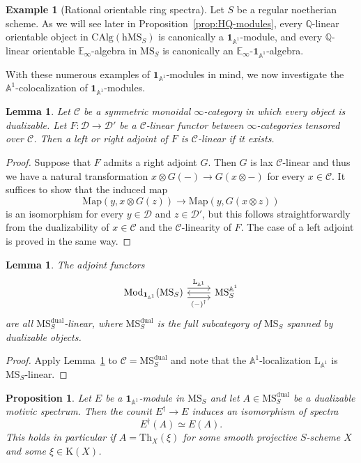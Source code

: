 \documentclass{amsart}
\numberwithin{equation}{section}
\theoremstyle{plain}
\newtheorem{proposition}[equation]{Proposition}
\newtheorem{lemma}[equation]{Lemma}
\theoremstyle{definition}
\newtheorem{example}[equation]{Example}
\let\bb=\mathbb
\def\Q{\bb Q}
\def\A{\bb A}
\def\1{\mathbf 1}
\def\h{\mathrm h}
\def\ph{\mathord-}
\def\L{\mathrm{L}{}}
\def\Map{\mathrm{Map}}
\def\Th{\mathrm{Th}}
\def\E{\mathbb{E}}
\let\cat=\mathrm
\def\K{\mathrm{K}{}}
\def\Mod{\cat{M}\mathrm{od}{}}
\def\MS{\mathrm{MS}}
\def\CAlg{\mathrm{CAlg}{}}
\newcommand{\CC}{\mathcal{C}}
\newcommand{\DD}{\mathcal{D}}
\def\dual{\mathrm{dual}}
\begin{document}
\begin{example}[Rational orientable ring spectra]
\label{ex:Q-orientable}
Let $S$ be a regular noetherian scheme. As we will see later in Proposition~\ref{prop:HQ-modules}, every $\Q$-linear orientable object in $\CAlg(\h\MS_S)$ is canonically a $\1_{\A^1}$-module, and every $\Q$-linear orientable $\E_\infty$-algebra in $\MS_S$ is canonically an $\E_\infty$-$\1_{\A^1}$-algebra.
\end{example}

With these numerous examples of $\1_{\A^1}$-modules in mind, we now investigate the $\A^1$-colocalization of $\1_{\A^1}$-modules.

\begin{lemma}\label{lem:dual0}
Let $\CC$ be a symmetric monoidal $\infty$-category in which every object is dualizable.
Let $F\colon\DD\to\DD'$ be a $\CC$-linear functor between $\infty$-categories tensored over $\CC$.
Then a left or right adjoint of $F$ is $\CC$-linear if it exists.
\end{lemma}

\begin{proof}
Suppose that $F$ admits a right adjoint $G$.
Then $G$ is lax $\CC$-linear and thus we have a natural transformation $x\otimes G(\ph)\to G(x\otimes\ph)$ for every $x\in\CC$.
It suffices to show that the induced map
\[
	\Map(y,x\otimes G(z)) \to \Map(y,G(x\otimes z))
\]
is an isomorphism for every $y\in\DD$ and $z\in\DD'$, but this follows straightforwardly from the dualizability of $x\in\CC$ and the $\CC$-linearity of $F$.
The case of a left adjoint is proved in the same way.
\end{proof}

\begin{lemma}\label{lem:dual}
The adjoint functors
\[
\begin{tikzcd}
	\Mod_{\1_{\A^1}}(\MS_S) \ar[r, shift left=2, "\L_{\A^1}"] \ar[r, shift right=2, "(\ph)^\dagger" swap] &  \MS_S^{\A^1} \ar[l]
\end{tikzcd}
\]
are all $\MS_S^\dual$-linear, where $\MS_S^\dual$ is the full subcategory of $\MS_S$ spanned by dualizable objects.
\end{lemma}

\begin{proof}
Apply Lemma~\ref{lem:dual0} to $\CC=\MS_S^\dual$ and note that the $\A^1$-localization $\L_{\A^1}$ is $\MS_S$-linear.
\end{proof}

\begin{proposition}\label{prop:coloc}
Let $E$ be a $\1_{\A^1}$-module in $\MS_S$ and let $A\in\MS_S^\dual$ be a dualizable motivic spectrum.
Then the counit $E^\dagger\to E$ induces an isomorphism of spectra
\[
	E^\dagger(A) \simeq E(A).
\]
This holds in particular if $A=\Th_X(\xi)$ for some smooth projective $S$-scheme $X$ and some $\xi\in\K(X)$.
\end{proposition}
\end{document}
